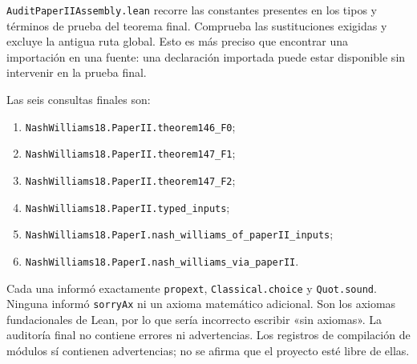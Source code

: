 \documentclass[spanish,11pt,a4paper]{article}
\providecommand{\tightlist}{\setlength{\itemsep}{0pt}\setlength{\parskip}{0pt}}
\begin{document}
\texttt{Audit\allowbreak{}Paper\allowbreak{}IIAssembly.\allowbreak{}lean} recorre las constantes presentes en los tipos y términos de prueba del teorema final. Comprueba las sustituciones exigidas y excluye la antigua ruta global. Esto es más preciso que encontrar una importación en una fuente: una declaración importada puede estar disponible sin intervenir en la prueba final.

Las seis consultas finales son:

\begin{enumerate}
\def\labelenumi{\arabic{enumi}.}
\tightlist
\item
  \texttt{Nash\allowbreak{}Williams18.\allowbreak{}Paper\allowbreak{}II.\allowbreak{}theorem146\_\allowbreak{}F0};
\item
  \texttt{Nash\allowbreak{}Williams18.\allowbreak{}Paper\allowbreak{}II.\allowbreak{}theorem147\_\allowbreak{}F1};
\item
  \texttt{Nash\allowbreak{}Williams18.\allowbreak{}Paper\allowbreak{}II.\allowbreak{}theorem147\_\allowbreak{}F2};
\item
  \texttt{Nash\allowbreak{}Williams18.\allowbreak{}Paper\allowbreak{}II.\allowbreak{}typed\_\allowbreak{}inputs};
\item
  \texttt{Nash\allowbreak{}Williams18.\allowbreak{}Paper\allowbreak{}I.\allowbreak{}nash\_\allowbreak{}williams\_\allowbreak{}of\_\allowbreak{}paper\allowbreak{}II\_\allowbreak{}inputs};
\item
  \texttt{Nash\allowbreak{}Williams18.\allowbreak{}Paper\allowbreak{}I.\allowbreak{}nash\_\allowbreak{}williams\_\allowbreak{}via\_\allowbreak{}paper\allowbreak{}II}.
\end{enumerate}

Cada una informó exactamente \texttt{propext}, \texttt{Classical.\allowbreak{}choice} y \texttt{Quot.\allowbreak{}sound}. Ninguna informó \texttt{sorry\allowbreak{}Ax} ni un axioma matemático adicional. Son los axiomas fundacionales de Lean, por lo que sería incorrecto escribir «sin axiomas». La auditoría final no contiene errores ni advertencias. Los registros de compilación de módulos sí contienen advertencias; no se afirma que el proyecto esté libre de ellas.
\end{document}
